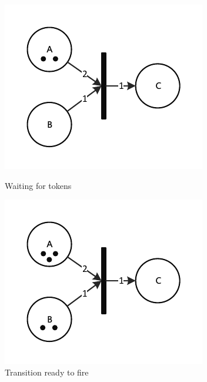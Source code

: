 \begin{figure}[!htb]
  \includegraphics[width=\linewidth]{drawings/Petri1.pdf}
  \caption{Waiting for tokens}\label{fig:petri1}
\endminipage\hfill
{}
  \includegraphics[width=\linewidth]{drawings/Petri2.pdf}
  \caption{Transition ready to fire}\label{fig:petri2}
\endminipage\hfill
{}%

\end{figure}
